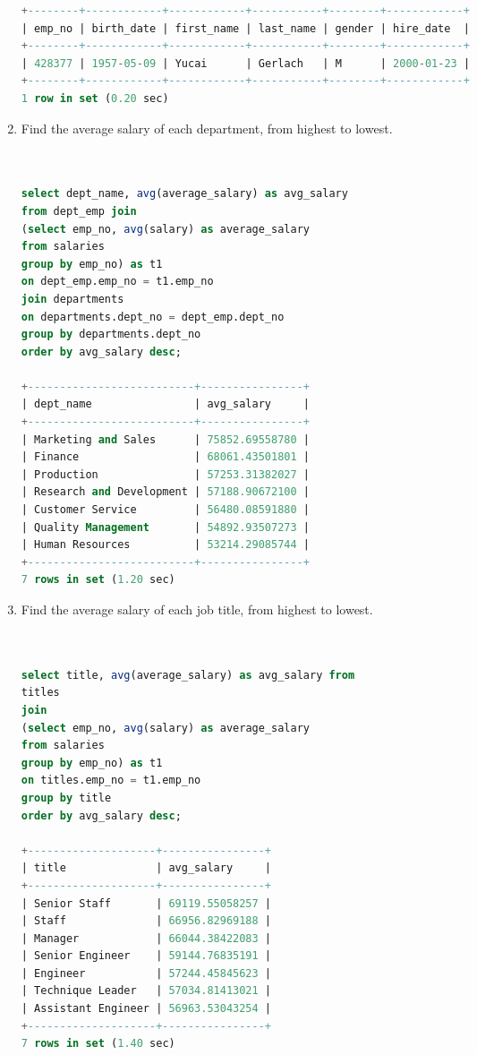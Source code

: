 \documentclass[12pt]{article}
\begin{document}
\begin{enumerate}
\begin{lstlisting}[language=SQL]
+--------+------------+------------+-----------+--------+------------+
| emp_no | birth_date | first_name | last_name | gender | hire_date  |
+--------+------------+------------+-----------+--------+------------+
| 428377 | 1957-05-09 | Yucai      | Gerlach   | M      | 2000-01-23 |
+--------+------------+------------+-----------+--------+------------+
1 row in set (0.20 sec)


\end{lstlisting}


\item Find the average salary of each department, from highest to lowest.

\begin{lstlisting}[language=SQL]


select dept_name, avg(average_salary) as avg_salary
from dept_emp join
(select emp_no, avg(salary) as average_salary
from salaries 
group by emp_no) as t1
on dept_emp.emp_no = t1.emp_no
join departments
on departments.dept_no = dept_emp.dept_no
group by departments.dept_no
order by avg_salary desc;

+--------------------------+----------------+
| dept_name                | avg_salary     |
+--------------------------+----------------+
| Marketing and Sales      | 75852.69558780 |
| Finance                  | 68061.43501801 |
| Production               | 57253.31382027 |
| Research and Development | 57188.90672100 |
| Customer Service         | 56480.08591880 |
| Quality Management       | 54892.93507273 |
| Human Resources          | 53214.29085744 |
+--------------------------+----------------+
7 rows in set (1.20 sec)

\end{lstlisting}


\item Find the average salary of each job title, from highest to lowest.

\begin{lstlisting}[language=SQL]


select title, avg(average_salary) as avg_salary from
titles
join
(select emp_no, avg(salary) as average_salary
from salaries 
group by emp_no) as t1
on titles.emp_no = t1.emp_no
group by title
order by avg_salary desc;

+--------------------+----------------+
| title              | avg_salary     |
+--------------------+----------------+
| Senior Staff       | 69119.55058257 |
| Staff              | 66956.82969188 |
| Manager            | 66044.38422083 |
| Senior Engineer    | 59144.76835191 |
| Engineer           | 57244.45845623 |
| Technique Leader   | 57034.81413021 |
| Assistant Engineer | 56963.53043254 |
+--------------------+----------------+
7 rows in set (1.40 sec)



\end{lstlisting}






\end{enumerate}



 
\end{document}
